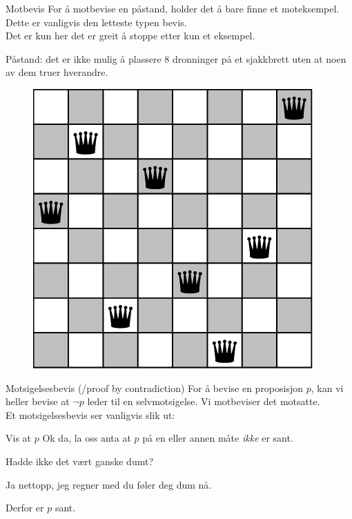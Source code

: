 \begin{frame}{Motbevis}
    For å motbevise en påstand, holder det å bare finne et moteksempel. Dette er vanligvis den letteste typen bevis.\\
    Det er kun her det er greit å stoppe etter kun et eksempel.
    \pause
    \begin{block}{Påstand: det er ikke mulig å plassere 8 dronninger på et sjakkbrett uten at noen av dem truer hverandre.}
    \pause
    \begin{figure}
        \centering
        \includegraphics[scale=0.20]{images/8 queens.png}
        \label{fig:my_label}
    \end{figure}
    
    \end{block}
\end{frame}

\begin{frame}{Motsigelsesbevis (/proof by contradiction)}
    For å bevise en proposisjon $p$, kan vi heller bevise at $\lnot p$ leder til en selvmotsigelse. 
    Vi motbeviser det motsatte.\\

    \pause
    Et motsigelsesbevis ser vanligvis slik ut:
    \begin{block}{Vis at $p$}
        Ok da, la oss anta at $p$ på en eller annen måte \emph{ikke} er sant.

        \pause
        Hadde ikke det vært ganske dumt?

        \pause
        Ja nettopp, jeg regner med du føler deg dum nå.

        \pause
        Derfor er $p$ sant.
    \end{block}
\end{frame}


